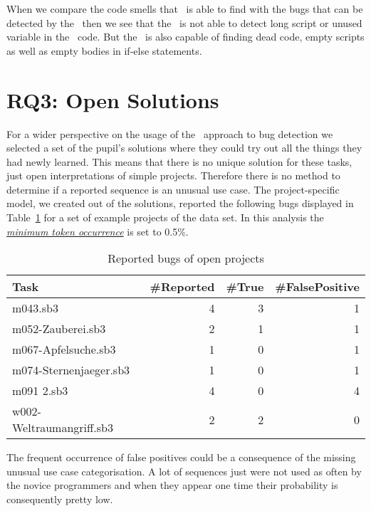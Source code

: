 When we compare the code smells that \litterbox\ is able to find with the bugs that can be detected by the \ngram\, then we see that the \ngram\ is not able to detect long script or unused variable in the \scratch\ code. But the \ngram\ is also capable of finding dead code, empty scripts as well as empty bodies in if-else statements. 
 

\section{RQ3: Open Solutions}\label{sec:gram_size}
For a wider perspective on the usage of the \ngram\ approach to bug detection we selected a set of the pupil's solutions where they could try out all the things they had newly learned. This means that there is no unique solution for these tasks, just open interpretations of simple projects. Therefore there is no method to determine if a reported sequence is an unusual use case. The project-specific model, we created out of the solutions, reported the following bugs displayed in Table~\ref{tab:open} for a set of example projects of the data set. In this analysis the \hyperref[def:minimum_token_occurrence]{\textit{minimum token occurrence}} is set to 0.5\%. 

\begin{table}[H]
    \centering
    \caption[Reported bugs of open projects]{\label{tab:open}Reported bugs of open projects}
    \begin{tabular}{lrrr}
        \toprule
        Task & \#Reported & \#True & \#FalsePositive \\
        \midrule
        m043.sb3 & 4 & 3 & 1 \\   
        m052-Zauberei.sb3 & 2 & 1 & 1 \\ 
        m067-Apfelsuche.sb3 & 1 & 0 & 1 \\
        m074-Sternenjaeger.sb3 & 1 & 0 & 1 \\
        m091 2.sb3 & 4 & 0 & 4 \\
        w002-Weltraumangriff.sb3 & 2 & 2 & 0 \\            
        \bottomrule
    \end{tabular}
\end{table}

The frequent occurrence of false positives could be a consequence of the missing unusual use case categorisation. A lot of sequences just were not used as often by the novice programmers and when they appear one time their probability is consequently pretty low. 


